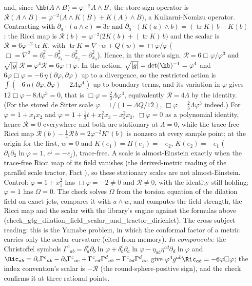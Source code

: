 and, since $\hb(A\wedge B) = \varphi^{-2}A\wedge B$, the store-sign operator is $\mathcal{R}(A\wedge B) = \varphi^{-2}\bigl(A\wedge K(B) + K(A)\wedge B\bigr)$, a Kulkarni-Nomizu operator. Contracting with $\partial_{a}\cdot(a\wedge c) = 3c$ and $\partial_{a}\cdot(K(a)\wedge b) = (\operatorname{tr}K)\,b - K(b)$: the Ricci map is $\mathcal{R}(b) = \varphi^{-2}\bigl(2K(b) + (\operatorname{tr}K)\,b\bigr)$ and the scalar is $\mathcal{R} = 6\varphi^{-2}\operatorname{tr}K$, with $\operatorname{tr}K = \nabla\cdot w + Q(w) = \Box\varphi/\varphi$ ($\Box = \nabla^{2} = \partial_{t}^{2} - \partial_{x_1}^{2} - \partial_{x_2}^{2} - \partial_{x_3}^{2}$). Hence, in the store's sign, $\mathcal{R} = 6\Box\varphi/\varphi^{3}$ and $\sqrt{|g|}\,\mathcal{R} = \varphi^{4}\mathcal{R} = 6\varphi\Box\varphi$. In the action, $\sqrt{|g|} = \det(\hb)^{-1} = \varphi^{4}$ and $6\varphi\Box\varphi = -6\,\eta(\partial\varphi, \partial\varphi)$ up to a divergence, so the restricted action is $\int(-6\,\eta(\partial\varphi, \partial\varphi) - 2\Lambda\varphi^{4})$ up to boundary terms, and its variation in $\varphi$ gives $12\Box\varphi - 8\Lambda\varphi^{3} = 0$, that is $\Box\varphi = \tfrac23\Lambda\varphi^{3}$, equivalently $\mathcal{R} = 4\Lambda$ by the identity. (For the stored de Sitter scale $\varphi = 1/(1 - \Lambda Q/12)$, $\Box\varphi = \tfrac23\Lambda\varphi^{3}$ indeed.) For $\varphi = 1 + x_{1}x_{2}$ and $\varphi = 1 + \tfrac13 t + x_{1}^{2}x_{3} - x_{2}^{2}x_{3}$, $\Box\varphi = 0$ as a polynomial identity, hence $\mathcal{R} = 0$ everywhere and both are stationary at $\Lambda = 0$, while the trace-free Ricci map $\mathcal{R}(b) - \tfrac14\mathcal{R}\,b = 2\varphi^{-2}K^{\circ}(b)$ is nonzero at every sample point; at the origin for the first, $w = 0$ and $K(e_{1}) = H(e_{1}) = -e_{2}$, $K(e_{2}) = -e_{1}$ ($\partial_{1}\partial_{2}\ln\varphi = 1$, $e^{j} = -e_{j}$), trace-free. A scale is almost-Einstein exactly when the trace-free Ricci map of its field vanishes (the derived-metric reading of the parallel scale tractor, Fact ), so these stationary scales are not almost-Einstein. Control: $\varphi = 1 + x_{1}^{2}$ has $\Box\varphi = -2 \ne 0$ and $\mathcal{R} \ne 0$, with the identity still holding; $\varphi = 1$ has $\Omega = 0$. The check solves $\Omega$ from the torsion equation of the dilation field on exact jets, compares it with $a \wedge w$, and computes the field strength, the Ricci map and the scalar with the library's engine against the formulas above (check\_gtg\_dilation\_field\_scalar\_and\_tractor\_dirichlet). The cross-subject reading: this is the Yamabe problem, in which the conformal factor of a metric carries only the scalar curvature (cited from memory). \emph{In components:} the Christoffel symbols $\Gamma^{c}{}_{ab} = \delta^{c}_{a}\partial_{b}\ln\varphi + \delta^{c}_{b}\partial_{a}\ln\varphi - \eta_{ab}\eta^{cd}\partial_{d}\ln\varphi$ and $\Ric_{ab} = \partial_{c}\Gamma^{c}{}_{ab} - \partial_{b}\Gamma^{c}{}_{ac} + \Gamma^{c}{}_{cd}\Gamma^{d}{}_{ab} - \Gamma^{c}{}_{bd}\Gamma^{d}{}_{ac}$ give $\varphi^{4}g^{ab}\Ric_{ab} = -6\varphi\Box\varphi$; the index convention's scalar is $-\mathcal{R}$ (the round-sphere-positive sign), and the check confirms it at three rational points.

